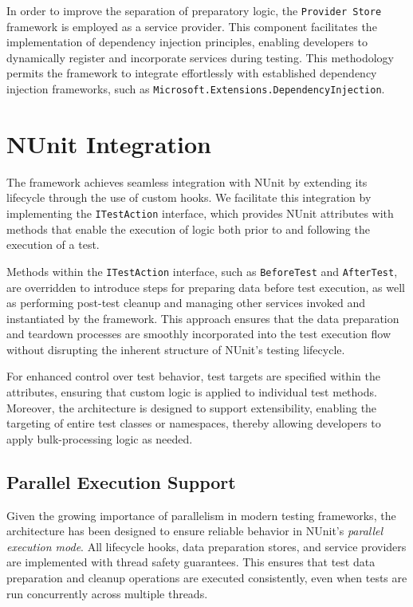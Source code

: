 In order to improve the separation of preparatory logic, the \texttt{Provider Store} framework is employed as a service provider. This component facilitates the implementation of dependency injection principles, enabling developers to dynamically register and incorporate services during testing. This methodology permits the framework to integrate effortlessly with established dependency injection frameworks, such as \texttt{Microsoft.Extensions.DependencyInjection}.


\section{NUnit Integration}
The framework achieves seamless integration with NUnit by extending its lifecycle through the use of custom hooks. We facilitate this integration by implementing the \texttt{ITestAction} interface, which provides NUnit attributes with methods that enable the execution of logic both prior to and following the execution of a test.

Methods within the \texttt{ITestAction} interface, such as \texttt{BeforeTest} and \texttt{AfterTest}, are overridden to introduce steps for preparing data before test execution, as well as performing post-test cleanup and managing other services invoked and instantiated by the framework. This approach ensures that the data preparation and teardown processes are smoothly incorporated into the test execution flow without disrupting the inherent structure of NUnit's testing lifecycle.

For enhanced control over test behavior, test targets are specified within the attributes, ensuring that custom logic is applied to individual test methods. Moreover, the architecture is designed to support extensibility, enabling the targeting of entire test classes or namespaces, thereby allowing developers to apply bulk-processing logic as needed.

\subsection{Parallel Execution Support}
Given the growing importance of parallelism in modern testing frameworks, the architecture has been designed to ensure reliable behavior in NUnit's \textit{parallel execution mode}. All lifecycle hooks, data preparation stores, and service providers are implemented with thread safety guarantees. This ensures that test data preparation and cleanup operations are executed consistently, even when tests are run concurrently across multiple threads.

